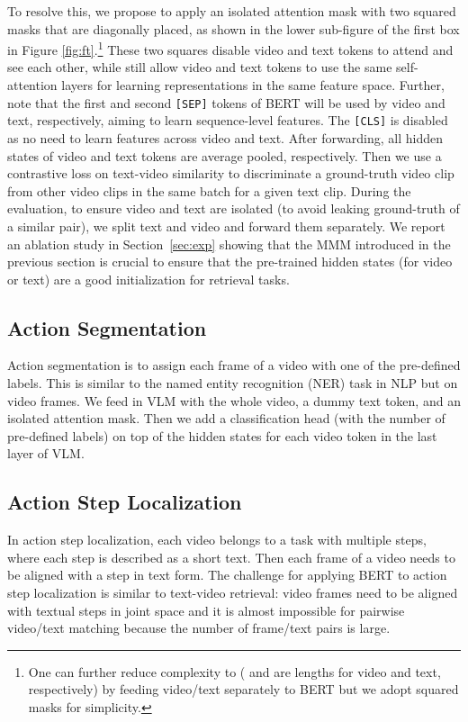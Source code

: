 \documentclass[11pt,a4paper]{article}
\begin{document}
To resolve this, we propose to apply an isolated attention mask with two squared masks that are diagonally placed, as shown in the lower sub-figure of the first box in Figure \ref{fig:ft}.\footnote{One can further reduce  complexity to  ( and  are lengths for video and text, respectively) by feeding video/text separately to BERT but we adopt squared masks for simplicity.}
These two squares disable video and text tokens to attend and see each other, while still allow video and text tokens to use the same self-attention layers for learning representations in the same feature space.
Further, note that the first and second \texttt{[SEP]} tokens of BERT will be used by video and text, respectively, aiming to learn sequence-level features\cite{clark2019does}. The \texttt{[CLS]} is disabled as no need to learn features across video and text.
After forwarding, all hidden states of video and text tokens are average pooled, respectively.
Then we use a contrastive loss on text-video similarity to discriminate a ground-truth video clip from other video clips in the same batch for a given text clip. 
During the evaluation, to ensure video and text are isolated (to avoid leaking ground-truth of a similar pair), we split text and video and forward them separately.
We report an ablation study in Section~\ref{sec:exp} showing that the MMM introduced in the previous section is crucial to ensure that the pre-trained hidden states (for video or text) are a good initialization for retrieval tasks.

\subsection{Action Segmentation}
Action segmentation is to assign each frame of a video with one of the pre-defined labels.
This is similar to the named entity recognition (NER) task in NLP but on video frames.
We feed in VLM with the whole video, a dummy text token, and an isolated attention mask. 
Then we add a classification head (with the number of pre-defined labels) on top of the hidden states for each video token in the last layer of VLM. 

\subsection{Action Step Localization}
In action step localization, each video belongs to a task with multiple steps, where each step is described as a short text.
Then each frame of a video needs to be aligned with a step in text form.
The challenge for applying BERT to action step localization is similar to text-video retrieval: video frames need to be aligned with textual steps in joint space and it is almost impossible for pairwise video/text matching because the number of frame/text pairs is large. 
\end{document}
